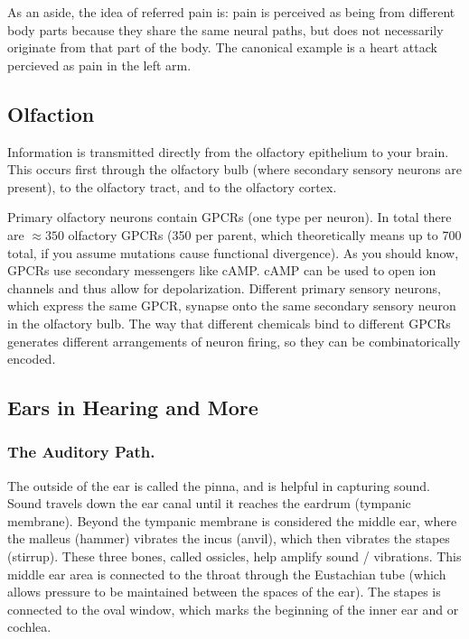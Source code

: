 As an aside, the idea of referred pain is: pain is perceived as being from different body parts because they share the same neural paths, but does not necessarily originate from that part of the body. The canonical example is a heart attack percieved as pain in the left arm.


\subsection{Olfaction}

Information is transmitted directly from the olfactory epithelium to your brain. This occurs first through the olfactory bulb (where secondary sensory neurons are present), to the olfactory tract, and to the olfactory cortex.\newline

Primary olfactory neurons contain GPCRs (one type per neuron). In total there are $\approx 350$ olfactory GPCRs (350 per parent, which theoretically means up to 700 total, if you assume mutations cause functional divergence). As you should know, GPCRs use secondary messengers like cAMP. cAMP can be used to open ion channels and thus allow for depolarization. Different primary sensory neurons, which express the same GPCR, synapse onto the same secondary sensory neuron in the olfactory bulb. The way that different chemicals bind to different GPCRs generates different arrangements of neuron firing, so they can be combinatorically encoded. 

\subsection{Ears in Hearing and More}

\subsubsection{The Auditory Path.}

The outside of the ear is called the pinna, and is helpful in capturing sound. Sound travels down the ear canal until it reaches the eardrum (tympanic membrane). Beyond the tympanic membrane is considered the middle ear, where the malleus (hammer) vibrates the incus (anvil), which then vibrates the stapes (stirrup). These three bones, called ossicles, help amplify sound / vibrations. This middle ear area is connected to the throat through the Eustachian tube (which allows pressure to be maintained between the spaces of the ear). The stapes is connected to the oval window, which marks the beginning of the inner ear and or cochlea.\newline

